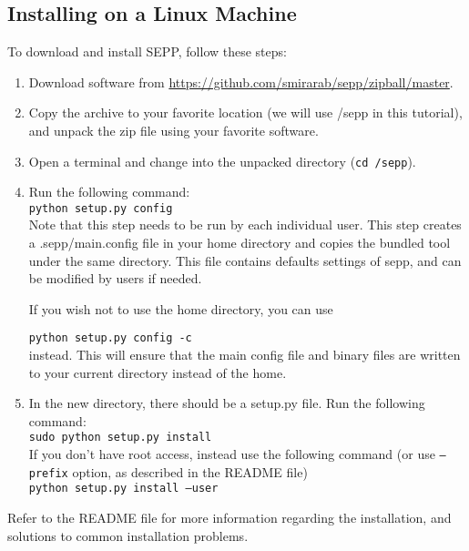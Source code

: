 \documentclass[11pt]{article} %
\newcommand{\sepp}{SEPP\xspace}
\newcommand{\ins}[1]{{\tt #1}}
\newcommand{\file}[1]{{\sf #1}}
\newcommand{\sepphome} {\file{{\raise.17ex\hbox{$\scriptstyle\sim$}}/sepp}\xspace}
\begin{document}
\subsection{Installing on a Linux Machine}
To download and install \sepp, follow these steps:

\begin{enumerate}
\item Download software from \url{https://github.com/smirarab/sepp/zipball/master}. 
\item Copy the archive to your favorite location (we will use \sepphome in this tutorial), and unpack the zip file using your favorite software. 
\item Open a terminal and change into the unpacked directory (\ins{cd \sepphome}). 

\item Run the following command:\\

\ins{python setup.py config}\\

Note that this step needs to be run by each individual user. This step creates a \file{.sepp/main.config}
file in your home directory and copies the bundled tool under the same directory. 
This file contains defaults settings of sepp, and can be modified by users if needed.

If you wish not to use the home directory, you can use 

\ins{python setup.py config -c}\\

instead. This will ensure that the main config file and binary files are written to your current
directory instead of the home. 

\item In the new directory, there should be a \file{setup.py} file. Run the following command:\\

\ins{sudo python setup.py install}\\

If you don't have root access, instead use the following command (or use \ins{--prefix} option, as described in the \file{README} file)\\

\ins{python setup.py install --user}


\end{enumerate}
Refer to the README file for more information regarding the installation, and solutions to common installation problems. 
\end{document}
